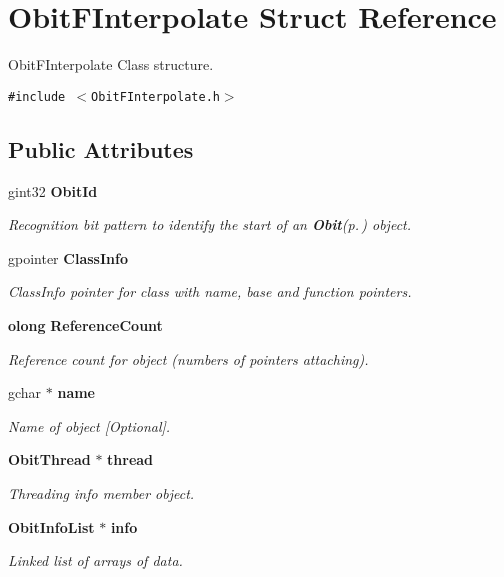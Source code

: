 \section{Obit\-FInterpolate Struct Reference}
\label{structObitFInterpolate}
Obit\-FInterpolate Class structure.  


{\tt \#include $<$Obit\-FInterpolate.h$>$}

\subsection*{Public Attributes}
\begin{CompactItemize}
\item 
gint32 {\bf Obit\-Id}
\begin{CompactList}\small\item\em Recognition bit pattern to identify the start of an {\bf Obit}{\rm (p.\,\pageref{structObit})} object. \item\end{CompactList}\item 
gpointer {\bf Class\-Info}
\begin{CompactList}\small\item\em Class\-Info pointer for class with name, base and function pointers. \item\end{CompactList}\item 
{\bf olong} {\bf Reference\-Count}
\begin{CompactList}\small\item\em Reference count for object (numbers of pointers attaching). \item\end{CompactList}\item 
gchar $\ast$ {\bf name}
\begin{CompactList}\small\item\em Name of object [Optional]. \item\end{CompactList}\item 
{\bf Obit\-Thread} $\ast$ {\bf thread}
\begin{CompactList}\small\item\em Threading info member object. \item\end{CompactList}\item 
{\bf Obit\-Info\-List} $\ast$ {\bf info}
\begin{CompactList}\small\item\em Linked list of arrays of data. \item\end{CompactList}\item 

\end{CompactItemize}
